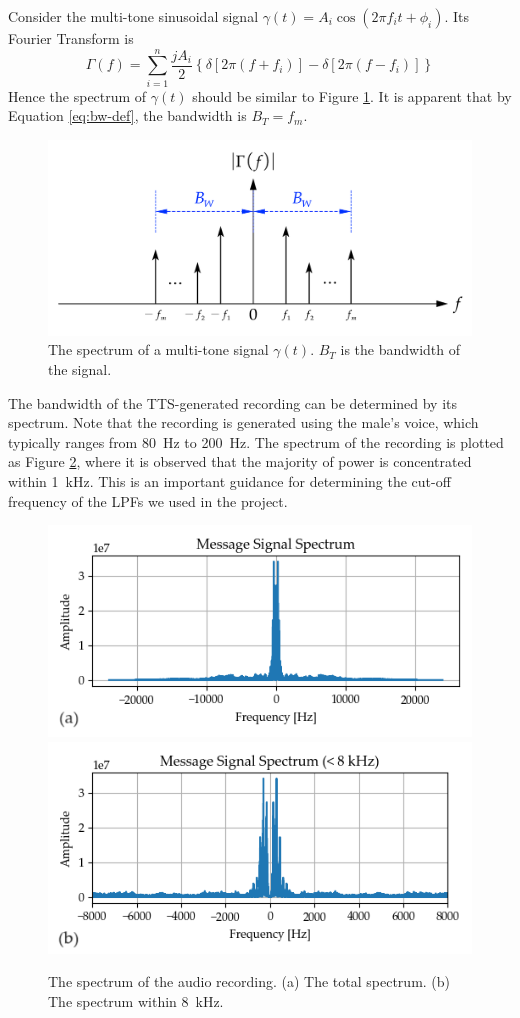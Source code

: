 \documentclass[../ECE459FinalProjectReport.tex]{subfiles}
\begin{document}
Consider the multi-tone sinusoidal signal $\gamma \left(t\right) = A_i\cos\left(2\pi f_i t + \phi_i\right)$. Its Fourier Transform is
\begin{equation}
    \Gamma \left(f\right) = \sum_{i=1}^{n} \frac{jA_i}{2}\left\lbrace \delta\left[ 2\pi \left(f + f_i \right)\right] - \delta\left[ 2\pi \left(f - f_i \right)\right]\right\rbrace
\end{equation}
Hence the spectrum of $\gamma\left(t\right)$ should be similar to Figure \ref{fig:multi-tone-spectrum}. It is apparent that by Equation \eqref{eq:bw-def}, the bandwidth is $B_T = f_m$.
\begin{figure}[tb]
    \centering
    \includegraphics[scale=.35]{plots/multi-tone_spectrum.pdf}
    \caption{The spectrum of a multi-tone signal $\gamma\left(t\right)$. $B_T$ is the bandwidth of the signal.}
    \label{fig:multi-tone-spectrum}
\end{figure}

The bandwidth of the TTS-generated recording can be determined by its spectrum. Note that the recording is generated using the male's voice, which typically ranges from \SI{80}{Hz} to \SI{200}{\Hz}. The spectrum of the recording is plotted as Figure \ref{fig:audio-spectrum}, where it is observed that the majority of power is concentrated within \SI{1}{kHz}. This is an important guidance for determining the cut-off frequency of the LPFs we used in the project.
\begin{figure}[tb]
    \centering
    \includegraphics[width=0.49\linewidth]{plots/audio_spectrum.png}
    \includegraphics[width=0.49\linewidth]{plots/audio_spectrum_8khz.png}
    \caption{The spectrum of the audio recording. (a) The total spectrum. (b) The spectrum within \SI{8}{kHz}.}
    \label{fig:audio-spectrum}
\end{figure}
\end{document}
